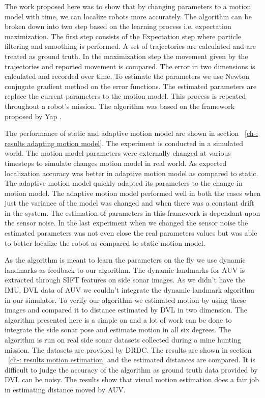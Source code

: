 \documentclass[12pt]{dalcsthesis}
\begin{document}
The work proposed here was to show that by changing parameters to a motion model with time, we can localize robots more accurately. The algorithm can be broken down into two step based on the learning process i.e. expectation maximization.  The first step consists of the Expectation step where particle filtering and smoothing is performed. A set of trajectories are calculated and are treated as ground truth. In the maximization step the movement given by the trajectories and reported movement is compared. The error in two dimensions is calculated and recorded over time. To estimate the parameters we use Newton conjugate gradient method on the error functions. The estimated parameters are replace the current parameters to the motion model. This process is repeated throughout a robot's mission. The algorithm was based on the framework proposed by Yap \cite{Yapp2008}. 

The performance of static and adaptive motion model are shown in section ~\ref{ch-: results adapting motion model}. The experiment is conducted in a simulated world. The motion model parameters were externally changed at various timesteps to simulate changes motion model in real world. As expected localization accuracy was better in adaptive motion model as compared to static. The adaptive motion model quickly adapted its parameters to the change in motion model. The adaptive motion model performed well in both the cases when just the variance of the model was changed and when there was a constant drift in the system. The estimation of parameters in this framework is dependant upon the sensor noise. In the last experiment when we changed the sensor noise the estimated parameters was not even close the real parameters values but was able to better localize the robot as compared to static motion model.

As the algorithm is meant to learn the parameters on the fly  we use dynamic landmarks as feedback to our algorithm. The dynamic landmarks for AUV is extracted through SIFT features on side sonar images. As we didn't have the IMU, DVL data of AUV we couldn't integrate the dynamic landmark algorithm in our simulator. To verify our algorithm we estimated motion by using these images and compared it to distance estimated by DVL in two dimension. The algorithm presented here is a simple on and a lot of work can be done to integrate the side sonar pose and estimate motion in all six degrees. The algorithm is run on real side sonar datasets collected during a mine hunting mission. The datasets are provided by DRDC. The results are shown in section ~\ref{ch-: results motion estimation} and the estimated distances are compared. It is difficult to judge the accuracy of the algorithm as ground truth data provided by DVL can be noisy.  The results show that visual motion estimation does a fair job in estimating distance moved by AUV. 
\end{document}
